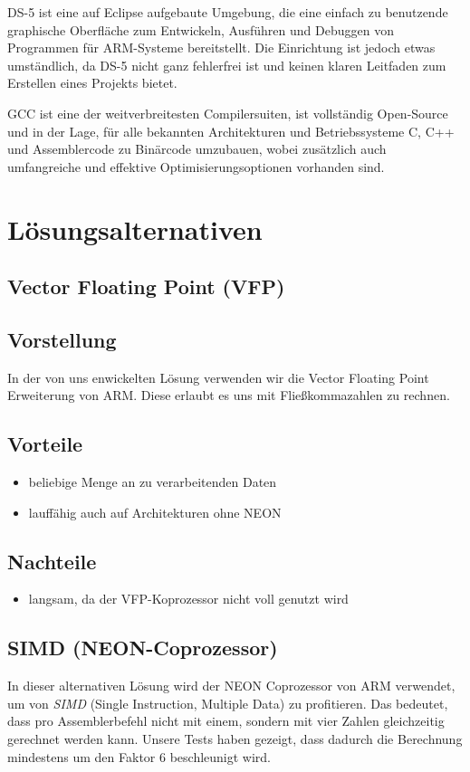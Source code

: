\documentclass[11pt]{scrartcl}
\begin{document}
DS-5 ist eine auf Eclipse aufgebaute Umgebung, die eine einfach zu benutzende graphische Oberfläche zum Entwickeln, Ausführen und Debuggen von Programmen für ARM-Systeme bereitstellt. Die Einrichtung ist jedoch etwas umständlich, da DS-5 nicht ganz fehlerfrei ist und keinen klaren Leitfaden zum Erstellen eines Projekts bietet.

GCC ist eine der weitverbreitesten Compilersuiten, ist vollständig Open-Source und in der Lage, für alle bekannten Architekturen und Betriebssysteme C, C++ und Assemblercode zu Binärcode umzubauen, wobei zusätzlich auch umfangreiche und effektive Optimisierungsoptionen vorhanden sind.

\section{Lösungsalternativen}
\subsection{Vector Floating Point (VFP)}
\subsection*{Vorstellung}
In der von uns enwickelten Lösung verwenden wir die Vector Floating Point Erweiterung von ARM. 
Diese erlaubt es uns mit Fließkommazahlen zu rechnen.
\subsection*{Vorteile}
\begin{itemize}
\item beliebige Menge an zu verarbeitenden Daten
\item lauffähig auch auf Architekturen ohne NEON
\end{itemize}
\subsection*{Nachteile}
\begin{itemize}
\item langsam, da der VFP-Koprozessor nicht voll genutzt wird
\end{itemize}
\subsection{SIMD (NEON-Coprozessor)}
In dieser alternativen Lösung wird der NEON Coprozessor von ARM verwendet, um von \emph{SIMD} (Single Instruction, Multiple Data)
zu profitieren. Das bedeutet, dass pro Assemblerbefehl nicht mit einem, sondern mit vier Zahlen gleichzeitig gerechnet werden kann. Unsere Tests haben gezeigt, dass dadurch die Berechnung mindestens um den Faktor 6 beschleunigt wird.
\end{document}
